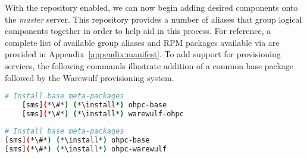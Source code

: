 With the \OHPC{} repository enabled, we can now begin adding desired components onto the
{\em master} server. This repository provides a number of aliases that group
logical components together in order to help aid in this process. For
reference, a complete list of available group aliases and RPM packages available
via \OHPC{} are provided in Appendix~\ref{appendix:manifest}. To add
support for provisioning services, the following commands illustrate addition
of a common base package followed by the Warewulf provisioning system.


\begin{lstlisting}[language=bash,keywords={}]
    # Install base meta-packages
    [sms](*\#*) (*\install*) ohpc-base
    [sms](*\#*) (*\install*) warewulf-ohpc
    \end{lstlisting}
\else
\begin{lstlisting}[language=bash,keywords={}]
# Install base meta-packages
[sms](*\#*) (*\install*) ohpc-base
[sms](*\#*) (*\install*) ohpc-warewulf
\end{lstlisting}
\fi


